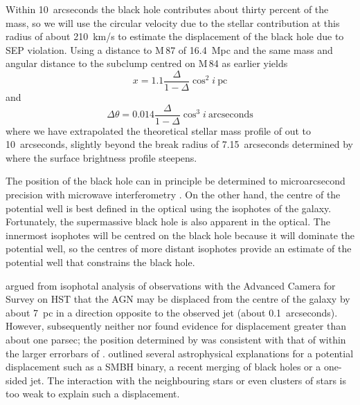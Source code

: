 \documentclass[useAMS,usenatbib]{mn2e}
\begin{document}
Within 10~arcseconds the black hole contributes about thirty percent
of the mass, so we will use the circular velocity due to the stellar
contribution at this radius of about 210~km/s to estimate the
displacement of the black hole due to SEP violation.  Using a distance
to M\,87 of 16.4~Mpc \citep{2010A&A...524A..71B} and the same mass and
angular distance to the subclump centred on M\,84 as earlier yields
\begin{equation}
  x = 1.1 \frac{\Delta}{1-\Delta} \cos^2 i ~\mathrm{pc}
  \label{eq:14}
\end{equation}
and
\begin{equation}
    \Delta \theta = 0.014 \frac{\Delta}{1-\Delta} \cos^3 i~
    \mathrm{arcseconds}
    \label{eq:15}
\end{equation}
where we have extrapolated the theoretical stellar mass profile of
\citet{2013ApJ...770...86W} out to 10~arcseconds, slightly beyond the
break radius of 7.15~arcseconds determined by
\cite{2006ApJS..164..334F} where the surface brightness profile
steepens.


The position of the black hole can in principle be determined to
microarcsecond precision with microwave interferometry
\citep{2011ApJ...735...57B}.  On the other hand, the centre of the
potential well is best defined in the optical using the isophotes of
the galaxy.  Fortunately, the supermassive black hole is also apparent
in the optical.  The innermost isophotes will be centred on the black
hole because it will dominate the potential well, so the centres of
more distant isophotes provide an estimate of the potential well that
constrains the black hole.

\citet{2010ApJ...717L...6B} argued from isophotal analysis of
observations with the Advanced Camera for Survey on HST that the AGN
may be displaced from the centre of the galaxy by about 7~pc in a
direction opposite to the observed jet (about 0.1~arcseconds).
However, subsequently 
neither
\citet{2011ApJ...729..119G} nor \citet{2013ApJ...770...86W} found
evidence for displacement greater than about one parsec; the position
determined by \citet{2011ApJ...729..119G} was consistent with that of
\citet{2010ApJ...717L...6B} within the larger errorbars of
\citet{2011ApJ...729..119G}.  \citet{2010ApJ...717L...6B} outlined
several astrophysical explanations for a potential displacement such
as a SMBH binary, a recent merging of black holes or a one-sided jet.
The interaction with the neighbouring stars or even clusters of stars
is too weak to explain such a displacement.
\end{document}
